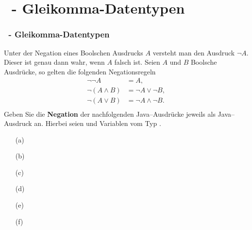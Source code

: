 \def\stitle{\theexercise\ - Gleikomma-Datentypen}
\section{\stitle}
\begin{frame}[t]%
  \frametitle{\stitle}
\medskip

Unter der Negation eines Boolschen Ausdrucks $A$ versteht man den Ausdruck $\neg A$. Dieser ist genau dann wahr, wenn $A$ falsch ist. Seien $A$ und $B$ Boolsche Ausdrücke, so gelten die folgenden Negationsregeln
\begin{align*}
\neg \neg A &= A,\\
\neg (A \wedge B) &= \neg A \vee \neg B,\\
\neg (A \vee B)   &= \neg A \wedge \neg B. \\
\end{align*}
Geben Sie die \textbf{Negation} der nachfolgenden Java--Ausdrücke jeweils als Java--Ausdruck an. Hierbei seien  und  Variablen vom Typ .\\[1em]
\begin{center}
\begin{minipage}{0.35\textwidth}
\begin{itemize}
\item[(a)] 
\item[(b)] 
\item[(c)] 
\end{itemize}
\end{minipage}
\quad
\begin{minipage}{0.6\textwidth}
\begin{itemize}
\item[(d)] 
\item[(e)] 
\item[(f)] 
\end{itemize}
\end{minipage}
\end{center}

\end{frame}
